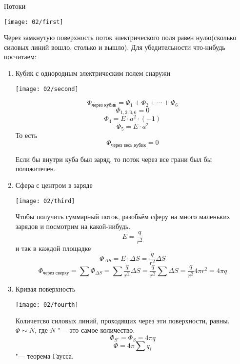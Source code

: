 
\begin{section}{Потоки}

	\begin{center}
	\texttt{[image: 02/first]}
	\end{center}

Через замкнутую поверхность поток электрического поля равен нулю(сколько силовых линий вошло, столько и вышло). 
Для убедительности что-нибудь посчитаем:
\begin{enumerate}

\item Кубик с однородным электрическим полем снаружи

	\begin{center}
	\texttt{[image: 02/second]}
	\end{center}

	\[\Phi_{\text{через кубик}} = \Phi_1 + \Phi_2 + \cdots + \Phi_6\]
	\[\Phi_{1, 2, 3, 6} = 0\]
	\[\Phi_4 = E \cdot a^2 \cdot (-1)\]
	\[\Phi_5 = E \cdot a^2\]
	То есть
	\[\Phi_{\text{через весь кубик}} = 0\]
	\begin{Rem}
	Если бы внутри куба был заряд, то поток через все грани был бы положителен.
	\end{Rem}
	
\item Сфера с центром в заряде

	\begin{center}
	\texttt{[image: 02/third]}
	\end{center}

	Чтобы получить суммарный поток, разобьём сферу на много маленьких зарядов и посмотрим на какой-нибудь.
	\[E = \frac{q}{r^2}\]
	и так в каждой площадке
	\[\Phi_{\Delta S} = E \cdot \Delta S = \frac{q}{r^2}\Delta S\]
	\[\Phi_{\text{через сверху}} = \sum \Phi_{\Delta S} = \sum \frac{q}{r^2}\Delta S = \frac{q}{r^2}\sum\Delta S 
	= \frac{q}{r^2}4\pi r^2 = 4 \pi q\]
	
\item Кривая поверхность
	
	\begin{center}
	\texttt{[image: 02/fourth]}
	\end{center}

	Количетсво силовых линий, проходящих через эти поверхности, равны. $\Phi \sim N$, где $N$ "--- это самое количество.
	\[\Phi_{S'} = \Phi_S = 4\pi q\]
	\[\Phi = 4\pi\sum q_i\] "--- теорема Гаусса.


\end{enumerate}
\end{section}
